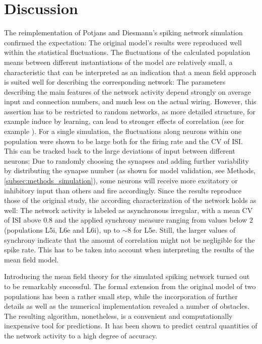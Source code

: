 \chapter{Discussion}
\label{sec:discussion}

The reimplementation of Potjans and Diesmann's spiking network simulation  
confirmed the expectation: The original model's results were reproduced 
well within the statistical fluctuations. The fluctuations of the calculated population 
means between different instantiations of the model are 
relatively small, a characteristic that can be interpreted as an indication that a mean 
field approach is suited well for describing the corresponding network:
The parameters describing the main features of the network activity
depend strongly on average input and connection numbers,
and much less on the actual wiring.
However, this assertion has to be restricted to 
random networks, as more detailed structure, for example induce by learning, 
can lead to stronger effects of correlation (see for example ).
For a single simulation, the fluctuations along neurons within one population
were shown to be large both for the firing rate and the 
CV of ISI. This can be tracked back to the large deviations of input between 
different neurons: Due to randomly choosing the synapses and adding further 
variability by distributing the synapse number (as shown for model validation, 
see Methods, \autoref{subsec:methods_simulation}), 
some neurons will receive more excitatory or inhibitory input than others 
and fire accordingly. 
Since the results reproduce those of the original study, the according characterization 
of the network holds as well: The network activity is labeled as asynchronous irregular, 
with a mean CV of ISI above 0.8 and the applied synchrony measure ranging from 
values below $2$ (populations L5i, L6e and L6i), up to $\sim 8$ for L5e.
Still, the larger values of synchrony indicate that the amount of correlation
might not be negligible for the spike rate. This has to be taken 
into account when interpreting the results of the mean field model. 

Introducing the mean field theory for the simulated spiking network 
turned out to be remarkably successful. 
The formal extension 
from the original model of two populations has been a rather small step, 
while the incorporation of further details as well as the numerical implementation 
revealed a number of obstacles. The resulting
algorithm, nonetheless, is a convenient and computationally inexpensive tool for 
predictions. It has been shown to predict central quantities 
of the network activity to a high degree of accuracy.  

